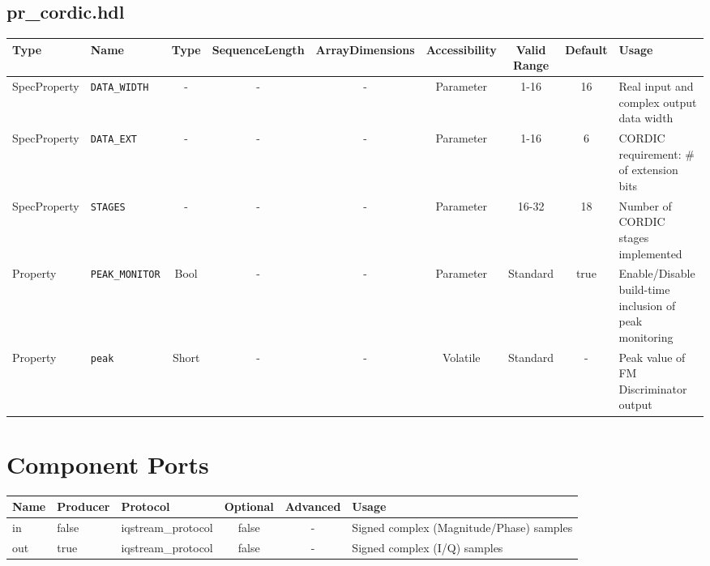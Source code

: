 \documentclass{article}
\def\comp{pr\_cordic}
\begin{document}
\begin{landscape}
	\subsection*{\comp.hdl}
	\begin{scriptsize}
		\begin{tabular}{|p{2cm}|p{1.5cm}|c|c|c|c|c|c|p{7cm}|}
			\hline
			\rowcolor{blue}
			Type         & Name              & Type & SequenceLength & ArrayDimensions & Accessibility & Valid Range & Default & Usage                                    \\
			\hline
			SpecProperty & \verb+DATA_WIDTH+ & -    & -              & -               & Parameter     & 1-16        & 16      & Real input and complex output data width \\
			\hline
			SpecProperty & \verb+DATA_EXT+   & -    & -              & -               & Parameter     & 1-16        & 6      & CORDIC requirement: \# of extension bits \\
			\hline
			SpecProperty & \verb+STAGES+     & -    & -              & -               & Parameter     & 16-32       & 18      & Number of CORDIC stages implemented      \\
			\hline
			Property & \verb+PEAK_MONITOR+     & Bool     & -              & -               & Parameter     & Standard        & true      & Enable/Disable build-time inclusion of peak monitoring \\
			\hline
			Property     & \verb+peak+  & Short & -              & -               & Volatile      & Standard    & -       & Peak value of FM Discriminator output \\
			\hline
		\end{tabular}
	\end{scriptsize}

	\section*{Component Ports}
	\begin{scriptsize}
		\begin{tabular}{|M{2cm}|M{1.5cm}|M{4cm}|c|c|M{9cm}|}
			\hline
			\rowcolor{blue}
			Name & Producer & Protocol           & Optional & Advanced & Usage                  \\
			\hline
			in   & false    & iqstream\_protocol & false    & -        & Signed complex (Magnitude/Phase) samples \\
			\hline
			out  & true     & iqstream\_protocol & false    & -        & Signed complex (I/Q) samples \\
			\hline
		\end{tabular}
	\end{scriptsize}


\end{landscape}
\end{document}
